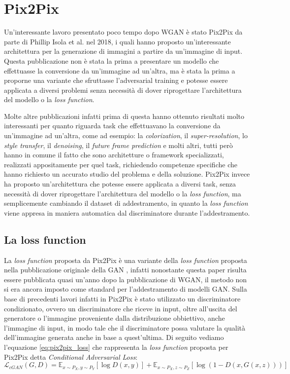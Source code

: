 \section{Pix2Pix}
Un'interessante lavoro presentato poco tempo dopo WGAN è stato Pix2Pix da parte di Phillip Isola et al. \cite{isola2018imagetoimage} nel 2018, i quali hanno proposto 
un'interessante architettura per la generazione di immagini a partire da un'immagine di input.
Questa pubblicazione non è stata la prima a presentare un modello che effettuasse la conversione da un'immagine ad un'altra, ma è stata la prima a 
proporne una variante che sfruttasse l'adversarial training e potesse essere applicata a diversi problemi senza necessità di dover riprogettare
l'architettura del modello o la \textit{loss function}.

Molte altre pubblicazioni infatti prima di questa hanno ottenuto risultati molto interessanti per quanto riguarda task che effettuavano la conversione
da un'immagine ad un'altra, come ad esempio: la \textit{colorization}, il \textit{super-resolution}, lo \textit{style transfer}, il \textit{denoising},
il \textit{future frame prediction} e molti altri, tutti però hanno in comune il fatto che sono architetture o framework specializzati, realizzati appositamente
per quel task, richiedendo competenze specifiche che hanno richiesto un accurato studio del problema e della soluzione.
Pix2Pix invece ha proposto un'architettura che potesse essere applicata a diversi task, senza necessità di dover riprogettare l'architettura del modello
o la \textit{loss function}, ma semplicemente cambiando il dataset di addestramento, in quanto la \textit{loss function} viene appresa in maniera automatica
dal discriminatore durante l'addestramento.

\subsection{La loss function}
La \textit{loss function} proposta da Pix2Pix è una variante della \textit{loss function} proposta nella pubblicazione originale della GAN \cite{goodfellow2014generative},
infatti nonostante questa paper risulta essere pubblicata quasi un'anno dopo la pubblicazione di WGAN, il metodo non si era ancora imposto come standard per
l'addestramento di modelli GAN.
Sulla base di precedenti lavori infatti in Pix2Pix è stato utilizzato un discriminatore condizionato, ovvero un discriminatore che riceve in input, oltre
all'uscita del generatore o l'immagine proveniente dalla distribuzione obbiettivo, anche l'immagine di input, in modo tale che il discriminatore possa
valutare la qualità dell'immagine generata anche in base a quest'ultima.
Di seguito vediamo l'equazione \ref{eq:pix2pix_loss} che rappresenta la \textit{loss function} proposta per Pix2Pix detta \textit{Conditional Adversarial Loss}:
\begin{equation}
    \label{eq:pix2pix_loss}
    \mathcal{L}_{cGAN}(G,D) = \mathbb{E}_{x \sim P_X,y \sim P_Y}[\log D(x,y)] + \mathbb{E}_{x \sim P_X,z \sim P_Z}[\log(1-D(x,G(x,z)))]
\end{equation}

